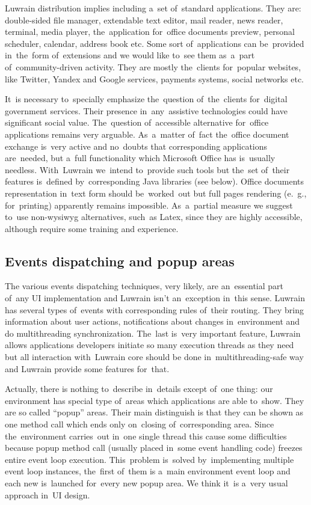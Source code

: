 \documentclass{acm_proc_article-sp}
\begin{document}
Luwrain distribution implies including a~set of~standard applications.
They are: 
double-sided file manager,
extendable text editor,
mail reader,
news reader,
terminal,
media player,
the~application for~office documents preview,
personal scheduler,
calendar,
address book etc.
Some sort of~applications can be~provided in~the~form of~extensions
and we would like to~see them as~a~part of~community-driven activity.
They are mostly the~clients for~popular websites, like 
Twitter,
Yandex and Google services,
payments systems, 
social networks etc.

It~is necessary to~specially emphasize the~question of~the~clients 
for~digital government services.
Their presence in~any~assistive  technologies could have significant social value.
The~question of~accessible alternative for~office applications remains very arguable.
As~a~matter of~fact the~office document exchange is~very active and 
no~doubts that corresponding applications are~needed,
but a~full functionality which Microsoft Office has is~usually needless.
With~Luwrain we~intend to~provide such tools 
but the~set of~their features is~defined by~corresponding Java libraries (see below).
Office documents representation in~text form should be~worked~out 
but full pages rendering (e.~g., for~printing) apparently remains impossible.
As~a~partial measure we suggest to~use non-wysiwyg alternatives, such~as Latex, since they are highly accessible,
 although require some training and experience. 

\subsection{Events dispatching and popup areas}

The various events dispatching techniques, very likely, are an~essential part of~any UI implementation
and Luwrain isn't an~exception in~this sense.
Luwrain has several types of~events with corresponding rules of~their routing.
They bring information about user actions,
notifications about changes in~environment and 
do multithreading synchronization.
The~last is~very important feature,
Luwrain allows applications developers initiate so many execution threads as they need 
but all interaction with~Luwrain core should be done in~multithreading-safe way
and Luwrain provide some features for~that.

Actually, there is nothing  to~describe in~details 
except of~one thing: our environment has special type of~areas which applications are able to~show.
They are so called ``popup'' areas.
Their main distinguish  is that they can be shown as one method call 
which ends only on~closing of~corresponding area.
Since the~environment carries~out in~one single thread 
this cause some difficulties because popup method call (usually placed in~some event handling code)
freezes entire event loop execution.
This~problem is~solved by~implementing multiple event loop instances,
the~first of~them is a~main environment event loop and each new is~launched for~every new popup area.
We think it~is a~very usual approach in~UI design.
\end{document}
